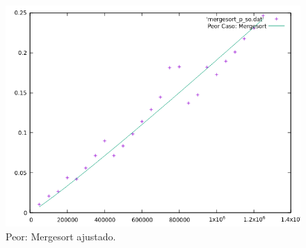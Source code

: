 \documentclass[a4paper,12pt,twoside]{article} %
\begin{document}
\begin{itemize}
\begin{figure}[h]
\begin{center}
  	\includegraphics[scale=0.8]{mergesort_p_so_a.png}
  	\caption{Peor: Mergesort ajustado.}
  	
  \end{center}
\end{figure}
		
		
		
	\end{itemize}
\newpage
	
\end{document}
